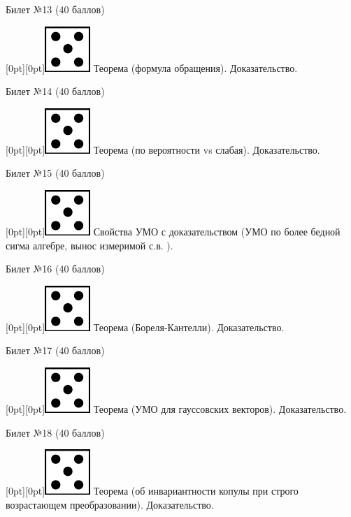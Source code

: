 \documentclass[preview]{standalone}
\begin{document}
\begin{center} {\Large Билет №13 (40 баллов)} \end{center}
\raisebox{-1pt}[0pt][0pt]{\includegraphics[width=0.02\linewidth]{5.png}} Теорема (формула обращения). Доказательство. \\
\begin{center} {\Large Билет №14 (40 баллов)} \end{center}
\raisebox{-1pt}[0pt][0pt]{\includegraphics[width=0.02\linewidth]{5.png}} Теорема (по вероятности vs слабая). Доказательство. \\  
\begin{center} {\Large Билет №15 (40 баллов)} \end{center}
\raisebox{-1pt}[0pt][0pt]{\includegraphics[width=0.02\linewidth]{5.png}} Свойства УМО с доказательством (УМО по более бедной сигма алгебре, вынос измеримой с.в. ). \\
\begin{center} {\Large Билет №16 (40 баллов)} \end{center}
\raisebox{-1pt}[0pt][0pt]{\includegraphics[width=0.02\linewidth]{5.png}} Теорема (Бореля-Кантелли). Доказательство. \\
\begin{center} {\Large Билет №17 (40 баллов)} \end{center}
\raisebox{-1pt}[0pt][0pt]{\includegraphics[width=0.02\linewidth]{5.png}} Теорема (УМО для гауссовских векторов). Доказательство. \\
\begin{center} {\Large Билет №18 (40 баллов)} \end{center}
\raisebox{-1pt}[0pt][0pt]{\includegraphics[width=0.02\linewidth]{5.png}} Теорема (об инвариантности копулы при строго возрастающем преобразовании). Доказательство. \\
\end{document}
